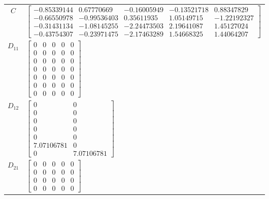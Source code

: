 \begin{tabular}{cl}
   $C$    & $\left[\begin{matrix}-0.85339144 & 0.67770669 & -0.16005949 & -0.13521718 & 0.88347829\\-0.66550978 & -0.99536403 & 0.35611935 & 1.05149715 & -1.22192327\\-0.31431134 & -1.08145255 & -2.24473503 & 2.19641087 & 1.45127024\\-0.43754307 & -0.23971475 & -2.17463289 & 1.54668325 & 1.44064207\end{matrix}\right]$                                                                    \\
 $D_{11}$ & $\left[\begin{matrix}0 & 0 & 0 & 0 & 0\\0 & 0 & 0 & 0 & 0\\0 & 0 & 0 & 0 & 0\\0 & 0 & 0 & 0 & 0\\0 & 0 & 0 & 0 & 0\\0 & 0 & 0 & 0 & 0\\0 & 0 & 0 & 0 & 0\end{matrix}\right]$                                                                                                                                                                                                           \\
 $D_{12}$ & $\left[\begin{matrix}0 & 0\\0 & 0\\0 & 0\\0 & 0\\0 & 0\\7.07106781 & 0\\0 & 7.07106781\end{matrix}\right]$                                                                                                                                                                                                                                                                             \\
 $D_{21}$ & $\left[\begin{matrix}0 & 0 & 0 & 0 & 0\\0 & 0 & 0 & 0 & 0\\0 & 0 & 0 & 0 & 0\\0 & 0 & 0 & 0 & 0\end{matrix}\right]$                                                                                                                                                                                                                                                                    \\
\hline
\end{tabular}